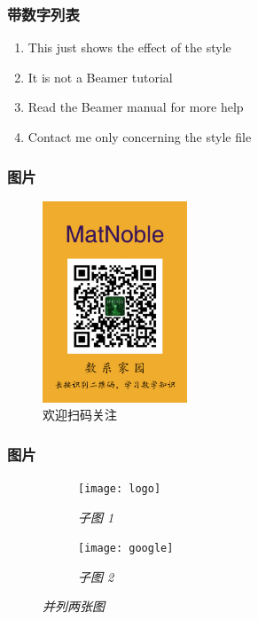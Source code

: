 \documentclass[10pt,aspectratio=43,serif]{beamer}
\begin{document}
\begin{frame}
    \frametitle{带数字列表}
    \begin{enumerate}
        \item This just shows the effect of the style
        \item It is not a Beamer tutorial
        \item Read the Beamer manual for more help
        \item Contact me only concerning the style file
    \end{enumerate}
\end{frame}

\begin{frame}
    \frametitle{图片}
    \begin{figure}
        \includegraphics[height=6cm]{figures/logo.jpg}
        \caption{欢迎扫码关注}
    \end{figure}
\end{frame}

\begin{frame}
    \frametitle{图片}
    \begin{figure}[H]
        \centering
        \begin{subfigure}{.48\textwidth}
            \centering
            \texttt{[image: logo]}
            \caption{\em 子图 1}
            \label{fig:v21}
        \end{subfigure}
        \begin{subfigure}{.48\textwidth}
            \centering
            \texttt{[image: google]}
            \caption{\em 子图 2}
            \label{fig:v22}
        \end{subfigure}
        \caption{\em 并列两张图}
        \label{fig:v2}
    \end{figure}
\end{frame}
\end{document}
